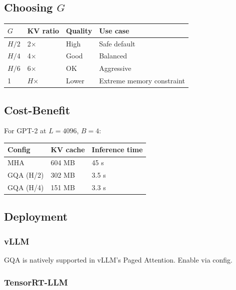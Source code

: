 \subsection{Choosing $G$}

\begin{table}[H]
\centering
\small
\begin{tabular}{llll}
\toprule
\textbf{$G$} & \textbf{KV ratio} & \textbf{Quality} & \textbf{Use case} \\
\midrule
$H/2$ & 2$\times$ & High & Safe default \\
$H/4$ & 4$\times$ & Good & Balanced \\
$H/6$ & 6$\times$ & OK & Aggressive \\
1 & $H$$\times$ & Lower & Extreme memory constraint \\
\bottomrule
\end{tabular}
\end{table}

\subsection{Cost-Benefit}

For GPT-2 at $L = 4096$, $B = 4$:

\begin{table}[H]
\centering
\small
\begin{tabular}{lll}
\toprule
\textbf{Config} & \textbf{KV cache} & \textbf{Inference time} \\
\midrule
MHA & 604 MB & 45 s \\
GQA (H/2) & 302 MB & 3.5 s \\
GQA (H/4) & 151 MB & 3.3 s \\
\bottomrule
\end{tabular}
\end{table}

\subsection{Deployment}

\subsubsection{vLLM}

GQA is natively supported in vLLM's Paged Attention. Enable via config.

\subsubsection{TensorRT-LLM}

